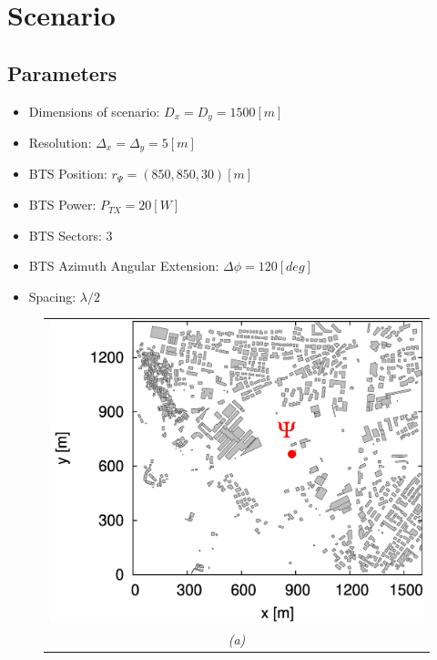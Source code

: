 \section{Scenario}
\subsection{Parameters}
\begin{minipage}{0.45\textwidth}
\begin{itemize}
\footnotesize
\item Dimensions of scenario: $D_{x}=D_{y}=1500[m]$
\item Resolution: $\Delta_{x}=\Delta_{y}=5[m]$
\item BTS Position: $r_{\Psi}=(850,850,30)[m]$
\item BTS Power: $P_{TX}=20[W]$
\item BTS Sectors: $3$
\item BTS Azimuth Angular Extension: $\Delta\phi=120[deg]$
\item Spacing: $\lambda/2$
\end{itemize}
\end{minipage}
\begin{minipage}{0.4\textwidth}
\begin{figure}[H]
\begin{tabular}{c}
\includegraphics[scale=0.12]{./Figure/Planning.EM/Fig.Scenario.BTS.jpg}
\tabularnewline
\emph{(a)}\tabularnewline
\end{tabular}
\end{figure}
\end{minipage}
\vspace{-10pt}
